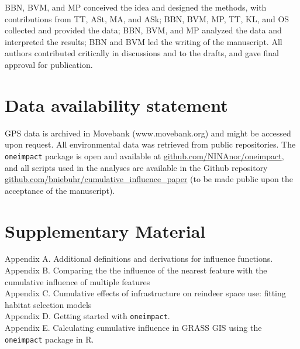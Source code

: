 \documentclass[titlepage]{article}
\begin{document}
BBN, BVM, and MP conceived the idea and designed the methods, with contributions from TT, ASt, MA, and ASk; BBN, BVM, MP, TT, KL, and OS collected and provided the data; BBN, BVM, and MP analyzed the data and interpreted the results; BBN and BVM led the writing of the manuscript. All authors contributed critically in discussions and to the drafts, and gave final approval for publication.

\section*{Data availability statement}

GPS data is archived in Movebank (www.movebank.org) and might be accessed upon request. All environmental data was retrieved from public repositories. The \verb|oneimpact| package is open and available at \url{github.com/NINAnor/oneimpact}, and all scripts used in the analyses are available in the Github repository \url{github.com/bniebuhr/cumulative_influence_paper} (to be made public upon the acceptance of the manuscript).

\section*{Supplementary Material}

Appendix A. Additional definitions and derivations for influence functions. \\
Appendix B. Comparing the the influence of the nearest feature with the cumulative influence of multiple features \\
Appendix C. Cumulative effects of infrastructure on reindeer space use: fitting habitat selection models \\
Appendix D. Getting started with \verb|oneimpact|. \\
Appendix E. Calculating cumulative influence in GRASS GIS using the \verb|oneimpact| package in R.



\end{document}

